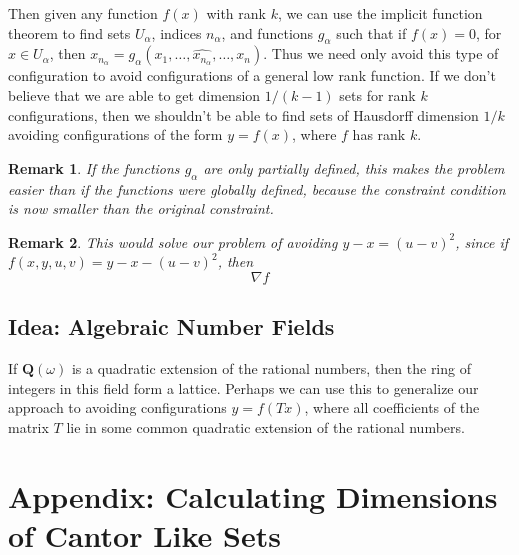 \documentclass{report}
\theoremstyle{plain}
\theoremstyle{plain}
\newtheorem*{remark}{Remark}
\begin{document}
Then given any function $f(x)$ with rank $k$, we can use the implicit function theorem to find sets $U_\alpha$, indices $n_\alpha$, and functions $g_\alpha$ such that if $f(x) = 0$, for $x \in U_\alpha$, then $x_{n_\alpha} = g_\alpha(x_1, \dots, \widehat{x_{n_\alpha}}, \dots, x_n)$. Thus we need only avoid this type of configuration to avoid configurations of a general low rank function. If we don't believe that we are able to get dimension $1/(k-1)$ sets for rank $k$ configurations, then we shouldn't be able to find sets of Hausdorff dimension $1/k$ avoiding configurations of the form $y = f(x)$, where $f$ has rank $k$. 

\begin{remark}
    If the functions $g_\alpha$ are only partially defined, this makes the problem easier than if the functions were globally defined, because the constraint condition is now smaller than the original constraint.
\end{remark}

\begin{remark}
    This would solve our problem of avoiding $y - x = (u - v)^2$, since if $f(x,y,u,v) = y - x - (u - v)^2$, then
    \[ \nabla f \]
\end{remark}

\section{Idea: Algebraic Number Fields}

If $\mathbf{Q}(\omega)$ is a quadratic extension of the rational numbers, then the ring of integers in this field form a lattice. Perhaps we can use this to generalize our approach to avoiding configurations $y = f(Tx)$, where all coefficients of the matrix $T$ lie in some common quadratic extension of the rational numbers.

\chapter{Appendix: Calculating Dimensions of Cantor Like Sets}
\end{document}
